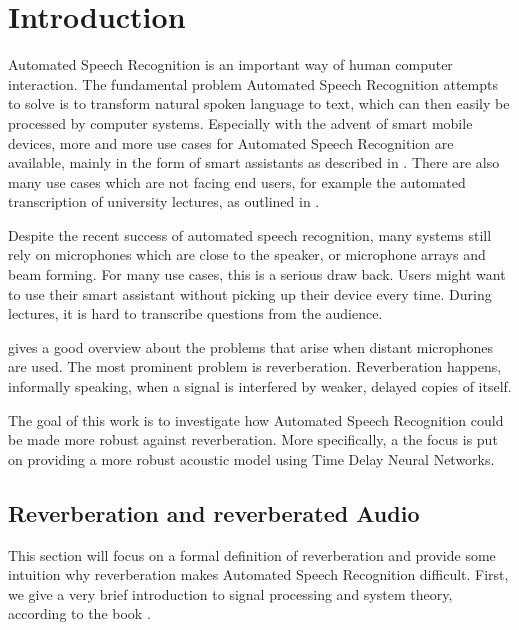 
\chapter{Introduction}
\label{ch:Introduction}

Automated Speech Recognition is an important way of human computer interaction. The fundamental problem Automated Speech Recognition attempts to solve is to transform natural spoken language to text, which can then easily be processed by computer systems. Especially with the advent of smart mobile devices, more and more use cases for Automated Speech Recognition are available, mainly in the form of smart assistants as described in \cite{lopez2017alexa}. There are also many use cases which are not facing end users, for example the automated transcription of university lectures, as outlined in \cite{muller2016lecture}.

Despite the recent success of automated speech recognition, many systems still rely on microphones which are close to the speaker, or microphone arrays and beam forming. For many use cases, this is a serious draw back. Users might want to use their smart assistant without picking up their device every time. During lectures, it is hard to transcribe questions from the audience. 

\cite{yoshioka2012making} gives a good overview about the problems that arise when distant microphones are used. The most prominent problem is reverberation. Reverberation happens, informally speaking, when a signal is interfered by weaker, delayed copies of itself. 

The goal of this work is to investigate how Automated Speech Recognition could be made more robust against reverberation. More specifically, a the focus is put on providing a more robust acoustic model using Time Delay Neural Networks. 

\section{Reverberation and reverberated Audio}

This section will focus on a formal definition of reverberation and provide some intuition why reverberation makes Automated Speech Recognition difficult. First, we give a very brief introduction to signal processing and system theory, according to the book \cite{leon2015signale}.

